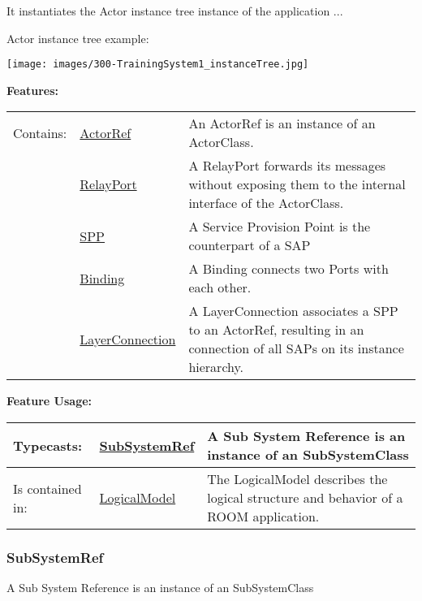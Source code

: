 	It instantiates the Actor instance tree instance of the application ...
	
	Actor instance tree example:
	
	\texttt{[image: images/300-TrainingSystem1\_instanceTree.jpg]}
		
		
	\begingroup
	\textbf{Features:}
	\renewcommand{\arraystretch}{1.8} %
	\begin{longtable}{l|l p{}}
		\hline
	Contains: & \tabitem \hyperlink{ref:ActorRef}{ActorRef}  & An ActorRef is an instance of an ActorClass.\\
	& \tabitem \hyperlink{ref:RelayPort}{RelayPort}  & A RelayPort forwards its messages without exposing them to the internal interface of the ActorClass. \\
	& \tabitem \hyperlink{ref:SPP}{SPP}  & A Service Provision Point is the counterpart of a SAP \\
	& \tabitem \hyperlink{ref:Binding}{Binding}  & A Binding connects two Ports with each other. \\
	& \tabitem \hyperlink{ref:LayerConnection}{LayerConnection}  & A LayerConnection associates a SPP to an ActorRef, resulting in an connection of all SAPs on its instance hierarchy. \\
	\hline
	\end{longtable}
	\endgroup
		
	\begingroup
	\textbf{Feature Usage:}
	\renewcommand{\arraystretch}{1.8} %
	\begin{longtable}{l|l p{}}
		\hline
	Typecasts: & \tabitem \hyperlink{ref:SubSystemRef}{SubSystemRef}  & A Sub System Reference is an instance of an SubSystemClass\\
	\hline
	Is contained in: & \tabitem \hyperlink{ref:LogicalModel}{LogicalModel}  & The LogicalModel describes the logical structure and behavior of a ROOM application.\\
	\hline
	\end{longtable}
	\endgroup
		
	
	\vspace{\baselineskip}
	\vspace{\baselineskip}
	\vspace{\baselineskip}
	
\subsubsection{SubSystemRef}
	\hypertarget{ref:SubSystemRef}{}
	A Sub System Reference is an instance of an SubSystemClass
		

